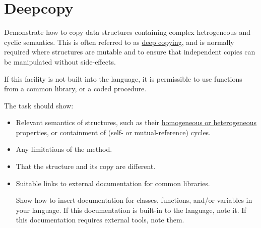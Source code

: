 \pagebreak{}
\section*{Deepcopy}

Demonstrate how to copy data structures containing complex
hetrogeneous and cyclic semantics. This is often referred to as
\href{http://en.wikipedia.org/wiki/Deep\_copy\#Deep\_copy}{deep
  copying}, and is normally required where structures are mutable and
to ensure that independent copies can be manipulated without
side-effects.

If this facility is not built into the language, it is permissible to
use functions from a common library, or a coded procedure.

The task should show:

\begin{itemize}
\item
  Relevant semantics of structures, such as their
  \href{http://en.wikipedia.org/wiki/Homogeneity\_and\_heterogeneity}{homogeneous
  or heterogeneous} properties, or containment of (self- or
  mutual-reference) cycles.
\end{itemize}

\begin{itemize}
\item
  Any limitations of the method.
\end{itemize}

\begin{itemize}
\item
  That the structure and its copy are different.
\end{itemize}

\begin{itemize}
\item
  Suitable links to external documentation for common libraries.

Show how to insert documentation for classes, functions, and/or
variables in your language. If this documentation is built-in to the
language, note it. If this documentation requires external tools, note
them.
\end{itemize}


